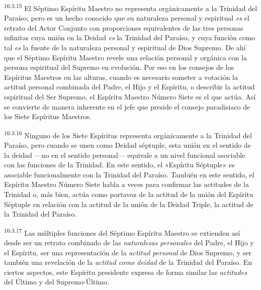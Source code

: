 \par
\textsuperscript{16:3.15} El Séptimo Espíritu Maestro no representa orgánicamente a la Trinidad del Paraíso; pero es un hecho conocido que su naturaleza personal y espiritual \textit{es} el retrato del Actor Conjunto con proporciones equivalentes de las tres personas infinitas cuya unión en la Deidad \textit{es} la Trinidad del Paraíso, y cuya función como tal \textit{es} la fuente de la naturaleza personal y espiritual de Dios Supremo. De ahí que el Séptimo Espíritu Maestro revele una relación personal y orgánica con la persona espiritual del Supremo en evolución. Por eso en los consejos de los Espíritus Maestros en las alturas, cuando es necesario someter a votación la actitud personal combinada del Padre, el Hijo y el Espíritu, o describir la actitud espiritual del Ser Supremo, el Espíritu Maestro Número Siete es el que actúa. Así se convierte de manera inherente en el jefe que preside el consejo paradisiaco de los Siete Espíritus Maestros.

\par
\textsuperscript{16:3.16} Ninguno de los Siete Espíritus representa orgánicamente a la Trinidad del Paraíso, pero cuando se unen como Deidad séptuple, esta unión en el sentido de la deidad ---no en el sentido personal--- equivale a un nivel funcional asociable con las funciones de la Trinidad. En este sentido, el «Espíritu Séptuple» es asociable funcionalmente con la Trinidad del Paraíso. También en este sentido, el Espíritu Maestro Número Siete habla a veces para confirmar las actitudes de la Trinidad o, más bien, actúa como portavoz de la actitud de la unión del Espíritu Séptuple en relación con la actitud de la unión de la Deidad Triple, la actitud de la Trinidad del Paraíso.

\par
\textsuperscript{16:3.17} Las múltiples funciones del Séptimo Espíritu Maestro se extienden así desde ser un retrato combinado de las \textit{naturalezas personales} del Padre, el Hijo y el Espíritu, ser una representación de la \textit{actitud personal} de Dios Supremo, y ser también una revelación de la \textit{actitud como deidad} de la Trinidad del Paraíso. En ciertos aspectos, este Espíritu presidente expresa de forma similar las \textit{actitudes} del Último y del Supremo-Último.

